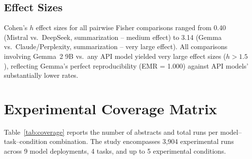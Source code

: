 \documentclass[11pt]{article}
\begin{document}
\subsection{Effect Sizes}

Cohen's $h$ effect sizes for all pairwise Fisher comparisons ranged from 0.40 (Mistral vs.\ DeepSeek, summarization -- medium effect) to 3.14 (Gemma vs.\ Claude/Perplexity, summarization -- very large effect). All comparisons involving Gemma~2 9B vs.\ any API model yielded very large effect sizes ($h > 1.5$), reflecting Gemma's perfect reproducibility (EMR = 1.000) against API models' substantially lower rates.


\section{Experimental Coverage Matrix}
\label{sec:s10}

Table~\ref{tab:coverage} reports the number of abstracts and total runs per model--task--condition combination. The study encompasses 3,904 experimental runs across 9 model deployments, 4 tasks, and up to 5 experimental conditions.
\end{document}
